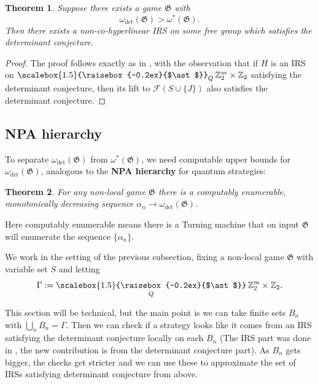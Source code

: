 \documentclass[pdflatex,sn-mathphys-num]{sn-jnl}%
\newtheorem{theorem}{Theorem}[section]
\newcommand{\Conv}{\mathop{\scalebox{1.5}{\raisebox{-0.2ex}{$\ast$}}}}
\begin{document}
\begin{theorem}\label{thm:3.5}
    Suppose there exists a game $\mathfrak{G}$ with
    \[
        \omega_{\mathrm{det}}(\mathfrak{G}) > \omega^*(\mathfrak{G}).
    \]
    Then there exists a non-co-hyperlinear IRS on some free group which satisfies the determinant conjecture.
\end{theorem}

\begin{proof}
    The proof follows exactly as in \cite[Theorem~3.5]{manzoor_there_2025},  
    with the observation that if $H$ is an IRS on  
    $\Conv_Q \mathbb{Z}_2^m \times \mathbb{Z}_2$ satisfying the determinant conjecture,  
    then its lift to $\mathcal{F}(S \cup \{J\})$ also satisfies the determinant conjecture.
\end{proof}



\subsection{NPA hierarchy}\label{sec:3.1}

To separate $\omega_{\mathrm{det}}(\mathfrak{G})$ from $\omega^*(\mathfrak{G})$,  
we need computable upper bounds for $\omega_{\mathrm{det}}(\mathfrak{G})$,  
analogous to the \textbf{NPA hierarchy} \cite{navascues_convergent_2008} for quantum strategies:  
\begin{theorem}\label{thm:det-npa}
    For any non-local game $\mathfrak{G}$ there is a computably enumerable, monotonically decreasing sequence $\alpha_n \to \omega_{\mathrm{det}}(\mathfrak{G})$.
\end{theorem}
Here computably enumerable means there is a Turning machine that on input $\mathfrak{G}$ will enumerate the sequence $\{\alpha_n\}$.

We work in the setting of the previous subsection,  
fixing a non-local game $\mathfrak{G}$ with variable set $S$ and letting
\[
    \Gamma := \Conv_Q \mathbb{Z}_2^m \times \mathbb{Z}_2.
\]

This section will be technical, but the main point is we can take finite sets $B_n$ with $\bigcup_n B_n = \Gamma$. Then we can check if a strategy looks like it comes from an IRS satisfying the determinant conjecture locally on each $B_n$ (The IRS part was done in \cite[Section 3.2]{manzoor_there_2025}, the new contribution is from the determinant conjecture part). As $B_n$ gets bigger, the checks get stricter and we can use these to approximate the set of IRSs satisfying determinant conjecture from above.
\end{document}
